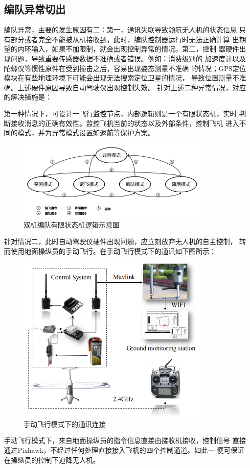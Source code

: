 \subsection{编队异常切出}
编队异常，主要的发生原因有二：第一，通讯失联导致领航无人机的状态信息
只有部分或者完全不能被从机接收到，此时，编队控制器运行时无法正确计算
出期望的内环输入，如果不加限制，就会出现控制异常的情况。第二，控制
器硬件出现问题，导致重要传感器数据不准确或者错误。例如：消费级别的
加速度计以及陀螺仪等惯性原件在受到撞击之后，容易出现姿态测量不准确
的情况；GPS定位模块在有些地理环境下可能会出现无法搜索定位卫星的情况，
导致位置测量不准确。上述硬件原因导致自动驾驶仪出现控制失效。
针对上述二种异常情况，对应的解决措施是：

第一种情况下，可设计一飞行监控节点，内部逻辑则是一个有限状态机，实时
判断接收消息的正确有效性。监控飞机当前的状态以及外部条件，控制飞机
进入不同的模式，并为异常模式设置如返航等保护方案。
\begin{figure}[H]
    \centering
    \includegraphics[width=0.85\textwidth]{figures/adds/states_mech}
    \caption{双机编队有限状态机逻辑示意图}\label{fig:c5-states_mech}
\end{figure}

针对情况二，此时自动驾驶仪硬件出现问题，应立刻放弃无人机的自主控制，
转而使用地面操纵员的手动飞行。在手动飞行模式下的通讯如下图所示：
\begin{figure}[H]
    \centering
    \includegraphics[width=0.85\textwidth]{figures/adds/protected_arch}
    \caption{手动飞行模式下的通讯连接}\label{fig:c5-protected_arch}
\end{figure}
手动飞行模式下，来自地面操纵员的指令信息直接由接收机接收，控制信号
直接通过Pixhawk，不经过任何处理直接接入飞机的四个控制通道。如此一
便可保证在操纵员的控制下迫降无人机。

